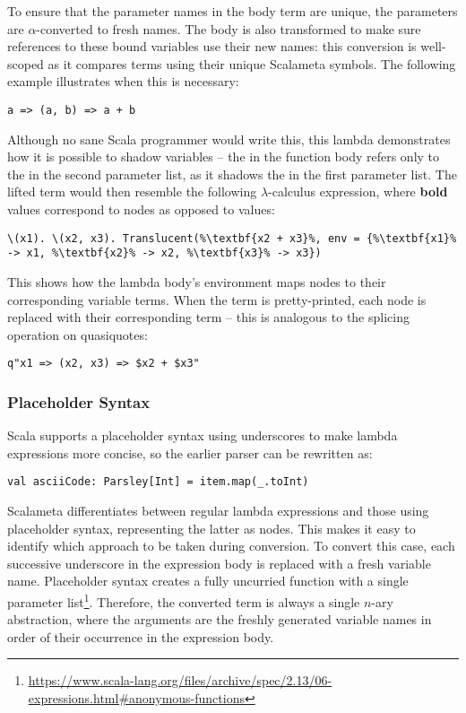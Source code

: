 \documentclass[../../../main.tex]{subfiles}
\begin{document}
To ensure that the parameter names in the  body term are unique, the parameters are $\alpha$-converted to fresh names.
The body is also transformed to make sure references to these bound variables use their new names: this conversion is well-scoped as it compares terms using their unique Scalameta symbols.
The following example illustrates when this is necessary:
\begin{verbatim}
a => (a, b) => a + b
\end{verbatim}
Although no sane Scala programmer would write this, this lambda demonstrates how it is possible to shadow variables -- the  in the function body refers only to the  in the second parameter list, as it shadows the  in the first parameter list.
The lifted  term would then resemble the following $\lambda$-calculus expression, where \textbf{bold} values correspond to  nodes as opposed to  values:
\begin{lstlisting}
\(x1). \(x2, x3). Translucent(%\textbf{x2 + x3}%, env = {%\textbf{x1}% -> x1, %\textbf{x2}% -> x2, %\textbf{x3}% -> x3})
\end{lstlisting}
This shows how the lambda body's environment maps  nodes to their corresponding variable terms.
When the term is pretty-printed, each  node is replaced with their corresponding  term -- this is analogous to the splicing operation on quasiquotes:
\begin{verbatim}
q"x1 => (x2, x3) => $x2 + $x3"
\end{verbatim}

\subsubsection{Placeholder Syntax}
Scala supports a placeholder syntax using underscores to make lambda expressions more concise, so the earlier parser can be rewritten as:
\begin{verbatim}
val asciiCode: Parsley[Int] = item.map(_.toInt)
\end{verbatim}
%
Scalameta differentiates between regular lambda expressions and those using placeholder syntax, representing the latter as  nodes.
This makes it easy to identify which approach to be taken during conversion.
To convert this case, each successive underscore in the expression body is replaced with a fresh variable name.
Placeholder syntax creates a fully uncurried function with a single parameter list\footnote{\url{https://www.scala-lang.org/files/archive/spec/2.13/06-expressions.html#anonymous-functions}}.
Therefore, the converted  term is always a single $n$-ary abstraction, where the arguments are the freshly generated variable names in order of their occurrence in the expression body.
\end{document}
